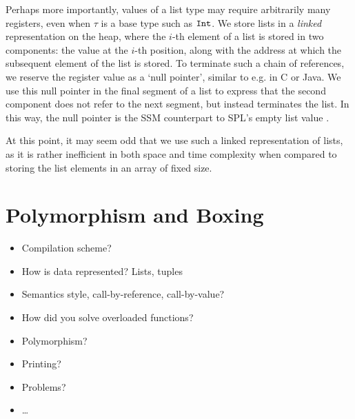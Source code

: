 Perhaps more importantly, values of a list type \code{[$\tau$]} may require
arbitrarily many registers, even when $\tau$ is a base type such as $\texttt{Int}$.
We store lists in a \emph{linked} representation on the heap, where the $i$-th
element of a list is stored in two components: the value at the $i$-th position,
along with the address at which the subsequent element of the list is stored.
To terminate such a chain of references, we reserve the register value
 as a `null pointer', similar to e.g.  in C or Java.
We use this null pointer in the final segment of a list to express that the
second component does not refer to the next segment, but instead terminates the
list. In this way, the null pointer is the SSM counterpart to SPL's empty list
value \spl{[]}.

At this point, it may seem odd that we use such a linked representation of
lists, as it is rather inefficient in both space and time complexity when
compared to storing the list elements in an array of fixed size.


\section{Polymorphism and Boxing}







\begin{itemize}
	\item Compilation scheme?
	\item How is data represented? Lists, tuples
	\item Semantics style, call-by-reference, call-by-value?
	\item How did you solve overloaded functions?
	\item Polymorphism?
	\item Printing?
	\item Problems?
	\item\ldots
\end{itemize}
